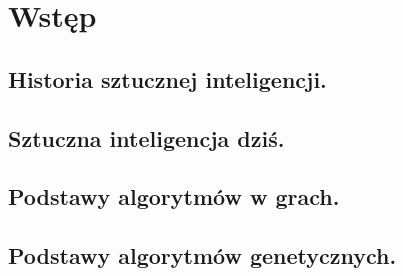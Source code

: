 \section{Wstęp}
\subsection{Historia sztucznej inteligencji.}

\subsection{Sztuczna inteligencja dziś.}

\subsection{Podstawy algorytmów w grach.}

\subsection{Podstawy algorytmów genetycznych.}

